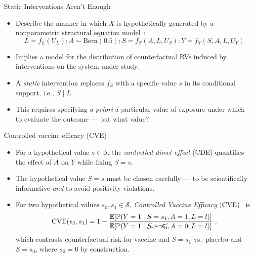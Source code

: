 \documentclass{beamer}
\begin{document}
\begin{frame}[c]{Static Interventions Aren't Enough}

\begin{center}
\begin{itemize}
  \itemsep8pt
  \item Describe the manner in which $X$ is hypothetically generated by a
    nonparametric structural equation model~\citep{pearl2009causality}:
    \begin{equation*}
      L = f_L(U_L); A \sim \text{Bern}(0.5);
      S = f_S(A, L, U_S); Y = f_Y(S, A, L, U_Y)
    \end{equation*}
  \item Implies a model for the distribution of counterfactual RVs induced by
    interventions on the system under study.
  \item A \textit{static} intervention replaces $f_S$ with a specific value $s$
    in its conditional support, i.e., $S \mid L$.
  \item This requires specifying \textit{a priori} a particular value of
    exposure under which to evaluate the outcome --- but what value?
\end{itemize}
\end{center}

\note{
}

\end{frame}


\begin{frame}[c]{Controlled vaccine efficacy (CVE)}

\begin{center}
\begin{itemize}
  \itemsep8pt
  \item For a hypothetical value $s \in \mathcal{S}$, the \textit{controlled
    direct effect} (CDE) quantifies the effect of $A$ on $Y$ while fixing
    $S = s$.
  \item The hypothetical value $S = s$ must be chosen carefully --- to
    be scientifically informative \textit{and} to avoid positivity violations.
  \item For two hypothetical values $s_0, s_1 \in \mathcal{S}$,
    \textit{Controlled Vaccine Efficacy} (CVE)~\citep{gilbert2022controlled} is
  \begin{equation*}
    \text{CVE}(s_0, s_1) = 1 -
      \frac{\mathbb{E}[\mathbb{P}(Y = 1 \mid S = s_1, A = 1, L = l)]}
      {\mathbb{E}[\mathbb{P}(Y = 1 \mid \cancel{S = s_0}, A = 0, L = l)]} \ ,
  \end{equation*}
  which contrasts counterfactual risk for vaccine and $S = s_1$ vs.~placebo
  and $S = s_0$, where $s_0 = 0$ by construction.
\end{itemize}
\end{center}

\note{
}

\end{frame}
\end{document}
